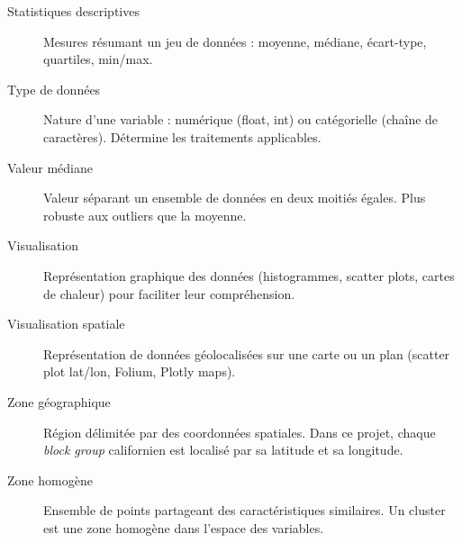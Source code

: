 \documentclass[11pt,a4paper]{article}
\begin{document}
\begin{description}
    \item[Statistiques descriptives] Mesures résumant un jeu de données : moyenne, médiane, écart-type, quartiles, min/max.
    \item[Type de données] Nature d'une variable : numérique (float, int) ou catégorielle (chaîne de caractères). Détermine les traitements applicables.
    \item[Valeur médiane] Valeur séparant un ensemble de données en deux moitiés égales. Plus robuste aux outliers que la moyenne.
    \item[Visualisation] Représentation graphique des données (histogrammes, scatter plots, cartes de chaleur) pour faciliter leur compréhension.
    \item[Visualisation spatiale] Représentation de données géolocalisées sur une carte ou un plan (scatter plot lat/lon, Folium, Plotly maps).
    \item[Zone géographique] Région délimitée par des coordonnées spatiales. Dans ce projet, chaque \textit{block group} californien est localisé par sa latitude et sa longitude.
    \item[Zone homogène] Ensemble de points partageant des caractéristiques similaires. Un cluster est une zone homogène dans l'espace des variables.
\end{description}
\end{document}
